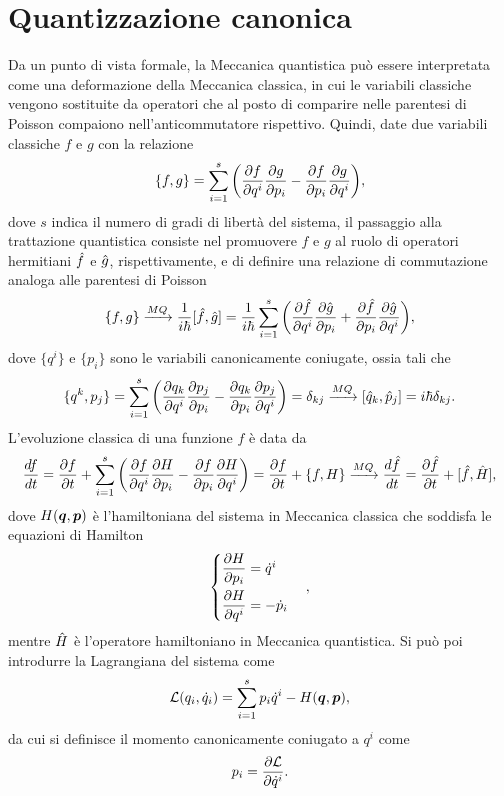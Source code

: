 \section{Quantizzazione canonica}
Da un punto di vista formale, la Meccanica quantistica può essere interpretata come una deformazione della Meccanica classica, in cui le variabili classiche vengono sostituite da operatori che al posto di comparire nelle parentesi di Poisson compaiono nell'anticommutatore rispettivo. Quindi, date due variabili classiche $f$ e $g$ con la relazione
\begin{equation}
    \{f,g\} = \sum_{i=1}^s\bigg(\frac{\partial f}{\partial q^i}\frac{\partial g}{\partial p_i} - \frac{\partial f}{\partial p_i}\frac{\partial g}{\partial q^i}\bigg),
\end{equation}
dove $s$ indica il numero di gradi di libertà del sistema, il passaggio alla trattazione quantistica consiste nel promuovere $f$ e $g$ al ruolo di operatori hermitiani $\hat{f}$ e $\hat{g}$, rispettivamente, e di definire una relazione di commutazione analoga alle parentesi di Poisson
\begin{equation}
     \{f,g\} \xrightarrow{MQ} \frac{1}{i\hbar}[\hat{f},\hat{g}] = \frac{1}{i\hbar} \sum_{i=1}^s\bigg(\frac{\partial \hat{f}}{\partial q^i}\frac{\partial \hat{g}}{\partial p_i} + \frac{\partial \hat{f}}{\partial p_i}\frac{\partial \hat{g}}{\partial q^i}\bigg),
\end{equation}
dove $\{q^i\}$ e $\{p_i\}$ sono le variabili canonicamente coniugate, ossia tali che
\begin{equation}
    \{q^k,p_j\} = \sum_{i=1}^s\bigg(\frac{\partial q_k}{\partial q^i}\frac{\partial p_j}{\partial p_i} - \frac{\partial q_k}{\partial p_i}\frac{\partial p_j}{\partial q^i}\bigg) = \delta_{kj} \xrightarrow{MQ} [\hat{q}_k,\hat{p}_j] = i\hbar\delta_{kj}.
\end{equation}
L'evoluzione classica di una funzione $f$ è data da
\begin{equation}
    \frac{df}{dt} = \frac{\partial f}{\partial t} + \sum_{i=1}^s\bigg(\frac{\partial f}{\partial q^i}\frac{\partial H}{\partial p_i} - \frac{\partial f}{\partial p_i}\frac{\partial H}{\partial q^i}\bigg) = \frac{\partial f}{\partial t} + \{f,H\} \xrightarrow{MQ} \frac{d\hat{f}}{dt} = \frac{\partial\hat{f}}{\partial t} + [\hat{f},\hat{H}],
\end{equation}
dove $H(\bm{q},\bm{p})$ è l'hamiltoniana del sistema in Meccanica classica che soddisfa le equazioni di Hamilton
\begin{equation}
    \begin{cases}
        \dfrac{\partial H}{\partial p_i} = \dot{q}^i \\[2ex]
        \dfrac{\partial H}{\partial q^i} = -\dot{p}_i
    \end{cases},
\end{equation}
mentre $\hat{H}$ è l'operatore hamiltoniano in Meccanica quantistica. Si può poi introdurre la Lagrangiana del sistema come
\begin{equation}
    \mathcal{L}(q_i,\dot{q}_i) = \sum_{i=1}^sp_i\dot{q}^i - H(\bm{q},\bm{p}),
\end{equation}
da cui si definisce il momento canonicamente coniugato a $q^i$ come
\begin{equation}
    p_i = \frac{\partial \mathcal{L}}{\partial \dot{q}^i}.
\end{equation}

